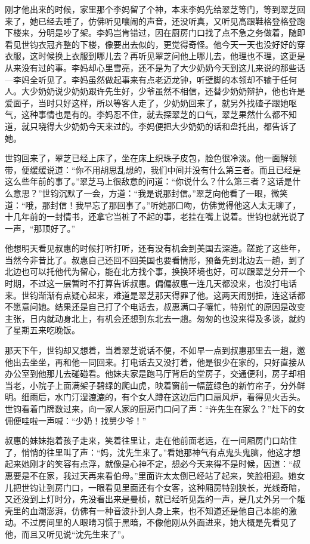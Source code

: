 \par 刚才他出来的时候，家里那个李妈留了个神，本来李妈先给翠芝等门，等到翠芝回来了，她已经去睡了，仿佛听见嚷闹的声音，还没听真，又听见高跟鞋格登格登跑下楼来，分明是吵了架。李妈岂肯错过，因在厨房门口找了点不急之务做着，随即看见世钧衣冠齐整的下楼，像要出去似的，更觉得奇怪。他今天一天也没好好的穿衣服，这时候换上衣服到哪儿去？再听见翠芝问他上哪儿去，他理也不理，这更是从来没有过的事。李妈却心里雪亮，还不是为了大少奶奶今天到这儿来说的那些话—李妈全听见了。李妈虽然做起事来有点老迈龙钟，听壁脚的本领却不输于任何人。大少奶奶说少奶奶跟许先生好，少爷虽然不相信，还替少奶奶辩护，他也许是爱面子，当时只好这样，所以等客人走了，少奶奶回来了，就另外找碴子跟她呕气，这种事情也是有的。李妈忍不住，就去探翠芝的口气，翠芝果然什么都不知道，就只晓得大少奶奶今天来过的。李妈便把大少奶奶的话和盘托出，都告诉了她。
\par 世钧回来了，翠芝已经上床了，坐在床上织珠子皮包，脸色很冷淡。他一面解领带，便缓缓说道：“你不用胡思乱想的，我们中间并没有什么第三者。而且已经是这么些年前的事了。”翠芝马上很敌意的问道：“你说什么？什么第三者？这话是什么意思？”世钧沉默了一会，方道：“我是说那封信。”翠芝向他看了一眼，微笑道：“哦，那封信！我早忘了那回事了。”听她那口吻，仿佛觉得他这人太无聊了，十几年前的一封情书，还拿它当桩了不起的事，老挂在嘴上说着。世钧也就光说了一声，“那顶好了。”
\par 他想明天看见叔惠的时候打听打听，还有没有机会到美国去深造。蹉跎了这些年，当然今非昔比了。叔惠自己还回不回美国也要看情形，预备先到北边去一趟，到了北边也可以托他代为留心，能在北方找个事，换换环境也好，可以跟翠芝分开一个时期，不过这一层暂时不打算告诉叔惠。偏偏叔惠一连几天都没来，也没打电话来。世钧渐渐有点疑心起来，难道是翠芝那天得罪了他。这两天闹别扭，连这话都不愿意问她。结果还是自己打了个电话去，叔惠满口子嚷忙，特别忙的原因是改变主张，日内就动身北上，有机会还想到东北去一趟。匆匆的也没来得及多谈，就约了星期五来吃晚饭。
\par 那天下午，世钧却又想着，当着翠芝说话不便，不如早一点到叔惠那里去一趟，邀他出去坐坐，再和他一同回来。打电话去又没打着，他是很少在家的，只好直接从办公室到他那儿去碰碰看。他妹夫家是跑马厅背后的堂房子，交通便利，房子却相当老，小院子上面满架子碧绿的爬山虎，映着窗前一幅蓝绿色的新竹帘子，分外鲜明。细雨后，水门汀湿漉漉的，有个女人蹲在这边后门口扇风炉，看得见火舌头。世钧看着门牌数过来，向一家人家的厨房门口问了声：“许先生在家么？”灶下的女佣便哇啦一声喊：“少奶！找舅少爷！”
\par 叔惠的妹妹抱着孩子走来，笑着往里让，走在他前面老远，在一间厢房门口站住了，悄悄的往里叫了声：“妈，沈先生来了。”看她那神气有点鬼头鬼脑，他这才想起来她刚才的笑容有点浮，就像是心神不定，想必今天来得不是时候，因道：“叔惠要是不在家，我过天再来看伯母。”里面许太太倒已经站了起来，笑脸相迎。她女儿把世钧让到房门口，一眼看见里面还有个女客，这种厢房特别狭长，光线奇暗，又还没到上灯时分，先没看出来是曼桢，就已经听见轰的一声，是几丈外另一个躯壳里的血潮澎湃，仿佛有一种音波扑到人身上来，也不知道还是他自己本能的激动。不过房间里的人眼睛习惯于黑暗，不像他刚从外面进来，她大概是先看见了他，而且又听见说“沈先生来了”。
